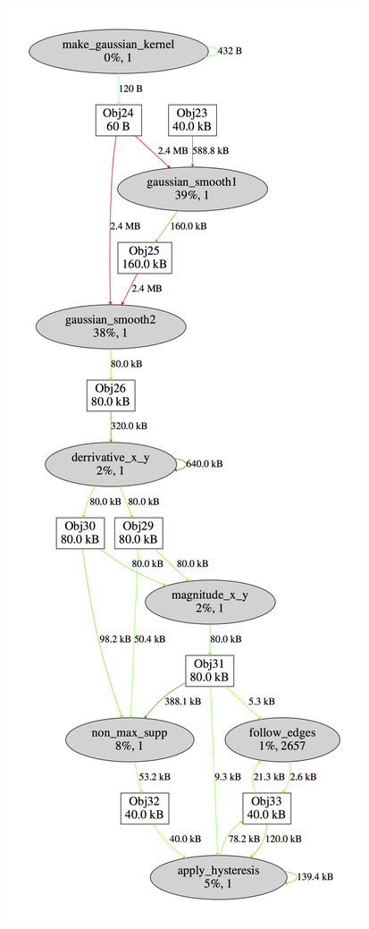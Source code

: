 \documentclass[10pt,final,journal]{IEEEtran}
\begin{document}
\begin{figure}[h!]
    \includegraphics[width=\linewidth]{full_profile}
\end{figure}
\end{document}
